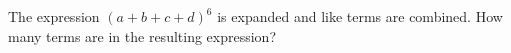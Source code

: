 The expression $(a+b+c+d)^6$ is expanded and like terms are combined. How many terms are in the resulting expression?

